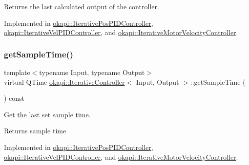 Returns the last calculated output of the controller. 

Implemented in \mbox{\hyperlink{classokapi_1_1IterativePosPIDController_aeb015338c954bf1a7ef0b792ea6c490c}{okapi\+::\+Iterative\+Pos\+P\+I\+D\+Controller}}, \mbox{\hyperlink{classokapi_1_1IterativeVelPIDController_ab3f4050524cb54b4e3df951a8d84ac57}{okapi\+::\+Iterative\+Vel\+P\+I\+D\+Controller}}, and \mbox{\hyperlink{classokapi_1_1IterativeMotorVelocityController_a078d0d0d20118e374d01d2b9eba23da3}{okapi\+::\+Iterative\+Motor\+Velocity\+Controller}}.

\mbox{\label{classokapi_1_1IterativeController_a48cd86626af7036db4f36b4124df4f98}} 
\subsubsection{\texorpdfstring{getSampleTime()}{getSampleTime()}}
{\footnotesize\ttfamily template$<$typename Input, typename Output$>$ \\
virtual Q\+Time \mbox{\hyperlink{classokapi_1_1IterativeController}{okapi\+::\+Iterative\+Controller}}$<$ Input, Output $>$\+::get\+Sample\+Time (\begin{DoxyParamCaption}{ }\end{DoxyParamCaption}) const\hspace{0.3cm}{\ttfamily [pure virtual]}}

Get the last set sample time.

\begin{DoxyReturn}{Returns}
sample time 
\end{DoxyReturn}


Implemented in \mbox{\hyperlink{classokapi_1_1IterativePosPIDController_a12d70574d5234d2928d77114e0c90df9}{okapi\+::\+Iterative\+Pos\+P\+I\+D\+Controller}}, \mbox{\hyperlink{classokapi_1_1IterativeVelPIDController_aa786680075677c2f43619d48cad0e154}{okapi\+::\+Iterative\+Vel\+P\+I\+D\+Controller}}, and \mbox{\hyperlink{classokapi_1_1IterativeMotorVelocityController_ae67b1aec831d3711f12beb85f69eb7f0}{okapi\+::\+Iterative\+Motor\+Velocity\+Controller}}.

\mbox{\label{classokapi_1_1IterativeController_a7c514b702b78be6c45c03b718edce035}} 

